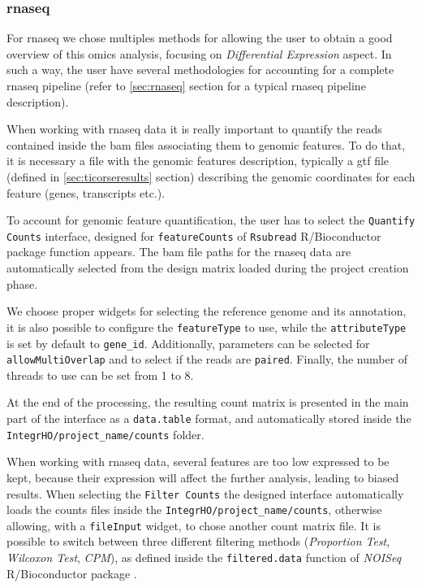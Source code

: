 \subsubsection{\gls{rnaseq}} \label{sec:integrhorna}
For \gls{rnaseq} we chose multiples methods for allowing the user to obtain a good overview of this omics analysis, focusing on \textit{Differential Expression} aspect.
In such a way, the user have several methodologies for accounting for a complete \gls{rnaseq} pipeline (refer to \ref{sec:rnaseq} section for a typical \gls{rnaseq} pipeline description).



When working with \gls{rnaseq} data it is really important to quantify the reads contained inside the \gls{bam} files associating them to genomic features.
To do that, it is necessary a file with the genomic features description, typically a \gls{gtf} file (defined in \ref{sec:ticorseresults} section) describing the genomic coordinates for each feature (genes, transcripts etc.).

To account for genomic feature quantification, the user has to select the \lstinline!Quantify Counts! interface, designed for \lstinline!featureCounts! of \lstinline!Rsubread! R/Bioconductor package function \cite{Liao2014} appears.
The  \gls{bam} file paths for the \gls{rnaseq} data are automatically selected from the design matrix loaded during the project creation phase.

We choose proper widgets for selecting the reference genome and its annotation, it is also possible to configure the \lstinline!featureType! to use, while the \lstinline!attributeType! is set by default to \lstinline!gene_id!.
Additionally, parameters can be selected for \lstinline!allowMultiOverlap! and to select if the reads are \lstinline!paired!.
Finally, the number of threads to use can be set from 1 to 8.

At the end of the processing, the resulting count matrix is presented in the main part of the interface as a \lstinline!data.table! format, and automatically stored inside the \lstinline!IntegrHO/project_name/counts! folder.



When working with \gls{rnaseq} data, several features are too low expressed to be kept, because their expression will affect the further analysis, leading to biased results.
When selecting the \lstinline!Filter Counts! the designed interface automatically loads the counts files inside the \lstinline!IntegrHO/project_name/counts!, otherwise allowing, with a \lstinline!fileInput! widget, to chose another count matrix file.
It is possible to switch between three different filtering methods (\textit{Proportion Test}, \textit{Wilcoxon Test}, \textit{CPM}), as defined inside the \lstinline!filtered.data! function of \textit{NOISeq} R/Bioconductor package \cite{Tarazona2011, Tarazona2015}.

